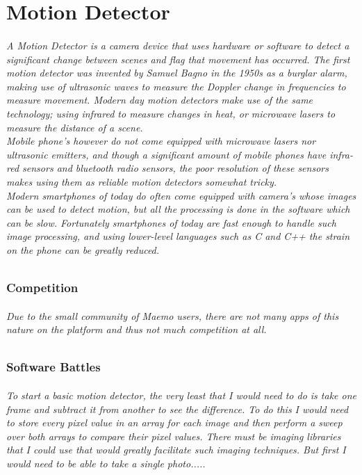 \documentclass[11pt]{article} %
\begin{document}



\part{Motion Detector}
\paragraph{A Motion Detector is a camera device that uses hardware or software to detect a significant change between scenes and flag that movement has occurred. The first motion detector was invented by Samuel Bagno in the 1950s as a burglar alarm, making use of ultrasonic waves to measure the Doppler change in frequencies to measure movement. Modern day motion detectors make use of the same technology; using infrared to measure changes in heat, or microwave lasers to measure the distance of a scene.\\
Mobile phone's however do not come equipped with microwave lasers nor ultrasonic emitters, and though a significant amount of mobile phones have infra-red sensors and bluetooth radio sensors, the poor resolution of these sensors makes using them as reliable motion detectors somewhat tricky.\\
Modern smartphones of today do often come equipped with camera's whose images can be used to detect motion, but all the processing is done in the software which can be slow. Fortunately smartphones of today are fast enough to handle such image processing, and using lower-level languages such as C and C++ the strain on the phone can be greatly reduced.}

\section{Competition}
\paragraph{Due to the small community of Maemo users, there are not many apps of this nature on the platform and thus not much competition at all.}

\section{Software Battles}
\paragraph{To start a basic motion detector, the very least that I would need to do is take one frame and subtract it from another to see the difference. To do this I would need to store every pixel value in an array for each image and then perform a sweep over both arrays to compare their pixel values. There must be imaging libraries that I could use that would greatly facilitate such imaging techniques. But first I would need to be able to take a single photo.....}
\end{document}
